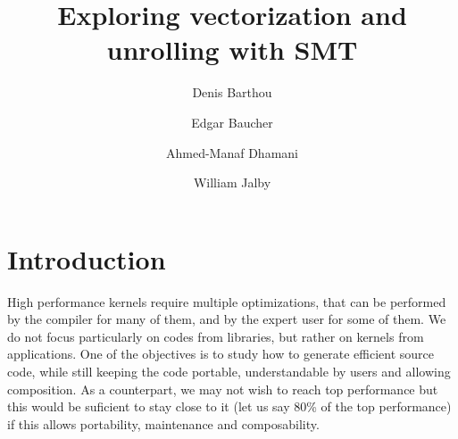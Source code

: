 \documentclass{article}
\begin{document}



\title{Exploring vectorization and unrolling with SMT}

\author{Denis Barthou \and Edgar Baucher \and Ahmed-Manaf Dhamani \and William Jalby}



\maketitle



\section{Introduction}
High performance kernels require multiple optimizations, that can be performed by the compiler for many of them, and by the expert user for some of them. We do not
focus particularly on codes from libraries, but rather on kernels from
applications. One of the objectives is to study how to generate
efficient source code, while still keeping the code portable,
understandable by users and allowing composition. As a counterpart, we
may not wish to reach top performance but this would be suficient to
stay close to it (let us say 80\% of the top performance) if this
allows portability, maintenance and composability.
\end{document}
